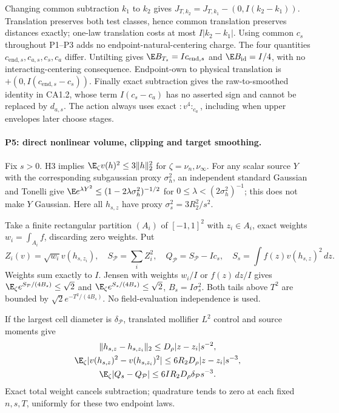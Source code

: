 Changing common subtraction $k_1$ to $k_2$ gives
$J_{T,k_2}=J_{T,k_1}-(0,I(k_2-k_1))$. Translation preserves both test
classes, hence common translation preserves distances exactly; one-law
translation costs at most $I|k_2-k_1|$. Using common $c_s$ throughout P1--P3
adds no endpoint-natural-centering charge. The four quantities
$c_{\mathrm{end},s},c_{a,s},c_s,c_a$ differ. Untilting gives
$\E B_{T_s}=Ic_{\mathrm{end},s}$ and $\E B_{\mathrm{id}}=I/4$, with
no interacting-centering consequence. Endpoint-own to physical translation
is $+(0,I(c_{\mathrm{end},s}-c_s))$.
Finally exact subtraction gives the raw-to-smoothed identity in CA1.2,
whose term $I(c_s-c_a)$ has no asserted sign and cannot be replaced by
$d_{a,s}$. The action always uses exact $:v^4:_{c_a}$, including when
upper envelopes later choose stages.

\paragraph{P5: direct nonlinear volume, clipping and target smoothing.}
Fix $s>0$. H3 implies $\E_\zeta v(h)^2\le3\|h\|_2^2$ for
$\zeta=\nu_n,\nu_\infty$. For any scalar source $Y$ with the corresponding
subgaussian proxy $\sigma_h^2$, an independent standard Gaussian and
Tonelli give
$\E e^{\lambda Y^2}\le(1-2\lambda\sigma_h^2)^{-1/2}$ for
$0\le\lambda<(2\sigma_h^2)^{-1}$; this does not make $Y$ Gaussian.
Here all $h_{s,z}$ have proxy $\sigma_s^2=3R_2^2/s^2$.

Take a finite rectangular partition $(A_i)$ of $[-1,1]^2$ with $z_i\in A_i$,
exact weights $w_i=\int_{A_i}f$, discarding zero weights. Put
\[
 Z_i(v)=\sqrt{w_i}v(h_{s,z_i}),\quad S_{\mathcal P}=\sum_iZ_i^2,\quad
 Q_{\mathcal P}=S_{\mathcal P}-Ic_s,\quad
 S_s=\int f(z)v(h_{s,z})^2\,dz .
\]
Weights sum exactly to $I$. Jensen with weights $w_i/I$ or $f(z)\,dz/I$
gives $\E_\zeta e^{S_{\mathcal P}/(4B_s)}\le\sqrt2$ and
$\E_\zeta e^{S_s/(4B_s)}\le\sqrt2$, $B_s=I\sigma_s^2$.
Both tails above $T^2$ are bounded by $\sqrt2e^{-T^2/(4B_s)}$.
No field-evaluation independence is used.

If the largest cell diameter is $\delta_{\mathcal P}$, translated
mollifier $L^2$ control and source moments give
\begin{gather*}
 \|h_{s,z}-h_{s,z_i}\|_2\le D_\rho|z-z_i|s^{-2},\\
 \E_\zeta|v(h_{s,z})^2-v(h_{s,z_i})^2|
          \le6R_2D_\rho|z-z_i|s^{-3},\\
 \E_\zeta|Q_s-Q_{\mathcal P}|\le6IR_2D_\rho\delta_{\mathcal P}s^{-3}.
\end{gather*}
Exact total weight cancels subtraction; quadrature tends to zero at each
fixed $n,s,T$, uniformly for these two endpoint laws.

